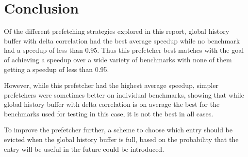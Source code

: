 \section{Conclusion}
\label{sec:conclusion}

Of the different prefetching strategies explored in this report,
global history buffer with delta correlation had the best average
speedup while no benchmark had a speedup of less than 0.95. Thus
this prefetcher best matches with the goal of achieving a speedup
over a wide variety of benchmarks with none of them getting a
speedup of less than 0.95.

However, while this prefetcher had the highest average
speedup, simpler prefetchers were sometimes better on
individual benchmarks, showing that while global history buffer
with delta correlation is on average the best for the benchmarks
used for testing in this case, it is not the best in all cases.

To improve the prefetcher further, a scheme to choose which
entry should be evicted when the global history buffer is full,
based on the probability that the entry will be useful in the
future could be introduced.


